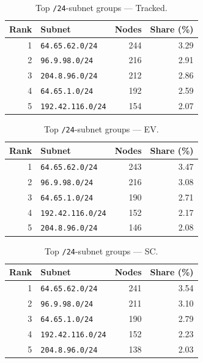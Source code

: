 \documentclass[conference]{IEEEtran}
\begin{document}
\begin{table}[H]
\caption{Top \texttt{/24}-subnet groups --- Tracked.}
\begin{center}\small
\begin{tabular}{|r|l|r|r|}
\hline
\textbf{Rank} & \textbf{Subnet} & \textbf{Nodes} & \textbf{Share (\%)} \\ \hline
1 & \texttt{64.65.62.0/24} & 244 & 3.29 \\ \hline
2 & \texttt{96.9.98.0/24} & 216 & 2.91 \\ \hline
3 & \texttt{204.8.96.0/24} & 212 & 2.86 \\ \hline
4 & \texttt{64.65.1.0/24} & 192 & 2.59 \\ \hline
5 & \texttt{192.42.116.0/24} & 154 & 2.07 \\ \hline
\end{tabular}
\label{tab:subnet_count_tracked}
\end{center}\end{table}
 
\begin{table}[H]
\caption{Top \texttt{/24}-subnet groups --- EV.}
\begin{center}\small
\begin{tabular}{|r|l|r|r|}
\hline
\textbf{Rank} & \textbf{Subnet} & \textbf{Nodes} & \textbf{Share (\%)} \\ \hline
1 & \texttt{64.65.62.0/24} & 243 & 3.47 \\ \hline
2 & \texttt{96.9.98.0/24} & 216 & 3.08 \\ \hline
3 & \texttt{64.65.1.0/24} & 190 & 2.71 \\ \hline
4 & \texttt{192.42.116.0/24} & 152 & 2.17 \\ \hline
5 & \texttt{204.8.96.0/24} & 146 & 2.08 \\ \hline
\end{tabular}
\label{tab:subnet_count_ephemeral_variable}
\end{center}\end{table}
 
\begin{table}[H]
\caption{Top \texttt{/24}-subnet groups --- SC.}
\begin{center}\small
\begin{tabular}{|r|l|r|r|}
\hline
\textbf{Rank} & \textbf{Subnet} & \textbf{Nodes} & \textbf{Share (\%)} \\ \hline
1 & \texttt{64.65.62.0/24} & 241 & 3.54 \\ \hline
2 & \texttt{96.9.98.0/24} & 211 & 3.10 \\ \hline
3 & \texttt{64.65.1.0/24} & 190 & 2.79 \\ \hline
4 & \texttt{192.42.116.0/24} & 152 & 2.23 \\ \hline
5 & \texttt{204.8.96.0/24} & 138 & 2.03 \\ \hline
\end{tabular}
\label{tab:subnet_count_static_control}
\end{center}\end{table}
 
\end{document}
